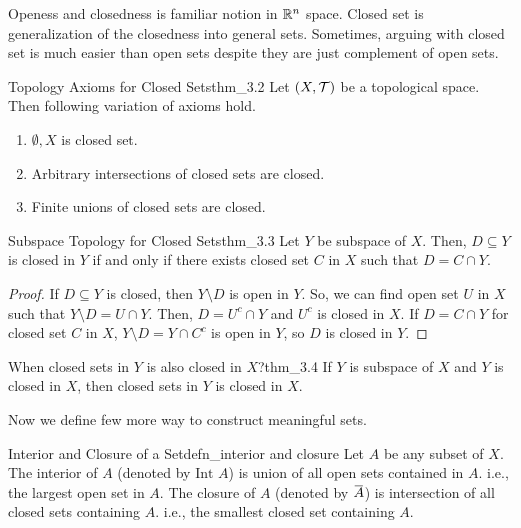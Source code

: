 \documentclass[12pt, a4paper, twoside]{article}
\newcommand{\overbar}[1]{\mkern 1.5mu\overline{\mkern-1.5mu#1\mkern-1.5mu}\mkern 1.5mu}
\theoremstyle{plain}
\begin{document}
Openess and closedness is familiar notion in ${\mathbb {R}}^n$ space. Closed set is generalization of the closedness into general sets. 
Sometimes, arguing with closed set is much easier than open sets despite they are just complement of open sets. 

\begin{thm}{Topology Axioms for Closed Sets}{thm_3.2}
    Let $(X, {\mathcal {T}})$ be a topological space. Then following variation of axioms hold. 
    \begin{enumerate}
        \item $\emptyset, X$ is closed set. 
        \item Arbitrary intersections of closed sets are closed. 
        \item Finite unions of closed sets are closed. 
    \end{enumerate}
\end{thm}

\begin{thm}{Subspace Topology for Closed Sets}{thm_3.3}
    Let $Y$ be subspace of $X$. Then, $D \subseteq Y$ is closed in $Y$ if and only if 
    there exists closed set $C$ in $X$ such that $D = C \cap Y$. 
\end{thm}

\begin{proof}
    If $D \subseteq Y$ is closed, then $Y \setminus D$ is open in $Y$. So, we can find 
    open set $U$ in $X$ such that $Y \setminus D = U \cap Y$. Then, $D = U^c \cap Y$ and $U^c$ is closed in $X$. If $D = C \cap Y$ for closed set $C$ in $X$, 
    $Y \setminus D = Y \cap C^c$ is open in $Y$, so $D$ is closed in $Y$. 
\end{proof}

\begin{thm}{When closed sets in $Y$ is also closed in $X$?}{thm_3.4}
    If $Y$ is subspace of $X$ and $Y$ is closed in $X$, then closed sets in $Y$ is closed in $X$. 
\end{thm}

Now we define few more way to construct meaningful sets. 

\begin{defn}{Interior and Closure of a Set}{defn_interior and closure}
    Let $A$ be any subset of $X$. The interior of $A$ (denoted by $\text{Int } A$) is union of all open sets contained in $A$. i.e., 
    the largest open set in $A$. The closure of $A$ (denoted by $\overbar{A}$) is intersection of all closed sets containing $A$. i.e., 
    the smallest closed set containing $A$. 
\end{defn}
\end{document}
